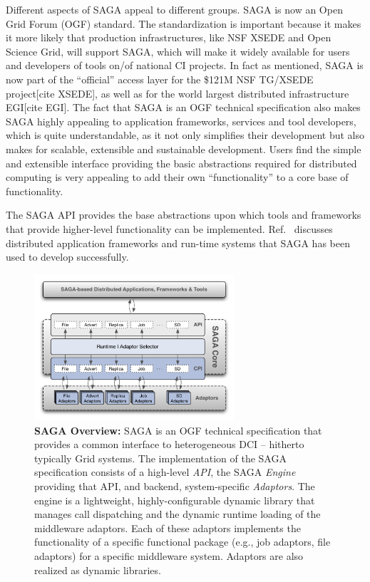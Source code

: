 \documentclass[]{svjour3}
\begin{document}
Different aspects of SAGA appeal to different groups. SAGA is now an
Open Grid Forum (OGF) standard. The standardization is important
because it makes it more likely that production infrastructures, like
NSF XSEDE and Open Science Grid, will support SAGA, which will make it
widely available for users and developers of tools on/of national CI
projects. In fact as mentioned, SAGA is now part of the “official”
access layer for the \$121M NSF TG/XSEDE project[cite XSEDE], as well
as for the world largest distributed infrastructure EGI[cite EGI]. The
fact that SAGA is an OGF technical specification also makes SAGA
highly appealing to application frameworks, services and tool
developers, which is quite understandable, as it not only simplifies
their development but also makes for scalable, extensible and
sustainable development. Users find the simple and extensible
interface providing the basic abstractions required for distributed
computing is very appealing to add their own “functionality” to a core
base of functionality.

The SAGA API provides the base abstractions upon which tools and
frameworks that provide higher-level functionality can be
implemented. Ref.~\cite{saga_url} discusses distributed application
frameworks and run-time systems that SAGA has been used to develop
successfully. 

\begin{figure}[t]
\centering \includegraphics[width=0.66\textwidth]{figures/saga-architecture-1.png}
\caption{\textbf{SAGA Overview: } SAGA is an OGF technical
  specification that provides a common interface to heterogeneous DCI
  -- hitherto typically Grid systems.  The implementation of the
  SAGA\cite{saga_url} specification consists of a high-level {\it
    API}, the SAGA {\it Engine} providing that API, and backend,
  system-specific {\it Adaptors}.  The engine is a lightweight,
  highly-configurable dynamic library that manages call dispatching
  and the dynamic runtime loading of the middleware adaptors.  Each of
  these adaptors implements the functionality of a specific functional
  package (e.g., job adaptors, file adaptors) for a specific
  middleware system. Adaptors are also realized as dynamic libraries.}
 \label{fig:saga-overview}
\end{figure}
 
\end{document}
